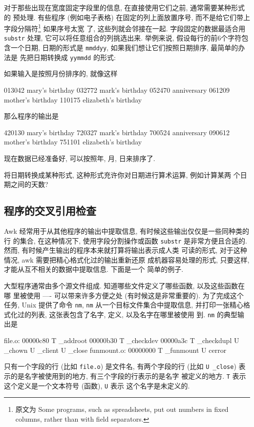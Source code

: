 对于那些出现在宽度固定字段里的信息, 在直接使用它们之前, 通常需要某种形式的
预处理. 有些程序 (例如电子表格) 在固定的列上面放置序号, 而不是给它们带上
字段分隔符\footnote{原文为 Some programs, such as spreadsheets, put out
numbers in fixed columns, rather than with field separators.} 如果序号太宽
了, 这些列就会邻接在一起. 字段固定的数据最适合用 \verb'substr' 处理,
它可以将任意组合的列挑选出来. 举例来说, 假设每行的前6个字符包含一个日期, 
日期的形式是 \verb'mmddyy', 如果我们想让它们按照日期排序, 最简单的办法是
先把日期转换成 \verb'yymmdd' 的形式:
如果输入是按照月份排序的, 就像这样
\begin{shell}
    013042 mary's birthday
    032772 mark's birthday
    052470 anniversary
    061209 mother's birthday
    110175 elizabeth's birthday
\end{shell}
那么程序的输出是
\begin{shell}
    420130 mary's birthday
    720327 mark's birthday
    700524 anniversary
    090612 mother's birthday
    751101 elizabeth's birthday
\end{shell}
现在数据已经准备好, 可以按照年, 月, 日来排序了.

\begin{exercise}
    将日期转换成某种形式, 这种形式充许你对日期进行算术运算, 例如计算某两
    个日期之间的天数?
\end{exercise}

\subsection{程序的交叉引用检查}
\label{subsec:program_cross_reference_checking}

Awk 经常用于从其他程序的输出中提取信息, 有时候这些输出仅仅是一些同种类的行
的集合, 在这种情况下, 使用字段分割操作或函数 \verb'substr'
是非常方便且合适的. 然而, 有时候产生输出的程序本来就打算将输出表示成人类
可读的形式, 对于这种情况, awk 需要把精心格式化过的输出重新还原
成机器容易处理的形式, 只要这样, 才能从互不相关的数据中提取信息. 下面是一个
简单的例子.

大型程序通常由多个源文件组成. 知道哪些文件定义了哪些函数, 以及这些函数在哪
里被使用 ---- 可以带来许多方便之处 (有时候这是非常重要的). 为了完成这个
任务, Unix 提供了命令 \verb'nm', \verb'nm' 从一个目标文件集合中提取信息,
并打印一张精心格式化过的列表, 这张表包含了名字, 定义, 以及名字在哪里被使用
到. \verb'nm' 的典型输出是
\begin{shell}
    file.o:
    00000c80 T _addroot
    00000b30 T _checkdev
    00000a3c T _checkdupl
             U _chown
             U _client
             U _close
    funmount.o:
    00000000 T _funmount
             U cerror
\end{shell}
只有一个字段的行 (比如 \verb'file.o') 是文件名, 有两个字段的行 (比如 
\verb'U _close') 表示的是名字被使用到的地方, 有三个字段的行表示的是名字
被定义的地方. \verb'T' 表示这个定义是一个文本符号 (函数), \verb'U' 表示 
这个名字是未定义的.

